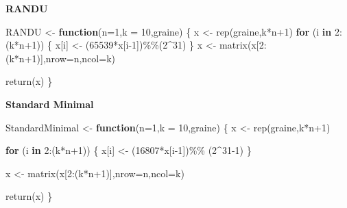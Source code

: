 \documentclass[
]{article}
\newenvironment{Shaded}{\begin{snugshade}}{\end{snugshade}}
\newcommand{\AttributeTok}[1]{\textcolor[rgb]{0.77,0.63,0.00}{#1}}
\newcommand{\ControlFlowTok}[1]{\textcolor[rgb]{0.13,0.29,0.53}{\textbf{#1}}}
\newcommand{\DecValTok}[1]{\textcolor[rgb]{0.00,0.00,0.81}{#1}}
\newcommand{\FunctionTok}[1]{\textcolor[rgb]{0.00,0.00,0.00}{#1}}
\newcommand{\NormalTok}[1]{#1}
\newcommand{\OtherTok}[1]{\textcolor[rgb]{0.56,0.35,0.01}{#1}}
\newcommand{\SpecialCharTok}[1]{\textcolor[rgb]{0.00,0.00,0.00}{#1}}
\begin{document}
\textbf{RANDU}

\begin{Shaded}
\begin{Highlighting}[]
\NormalTok{RANDU }\OtherTok{\textless{}{-}} \ControlFlowTok{function}\NormalTok{(}\AttributeTok{n=}\DecValTok{1}\NormalTok{,}\AttributeTok{k =} \DecValTok{10}\NormalTok{,graine)}
\NormalTok{\{}
\NormalTok{  x }\OtherTok{\textless{}{-}}  \FunctionTok{rep}\NormalTok{(graine,k}\SpecialCharTok{*}\NormalTok{n}\SpecialCharTok{+}\DecValTok{1}\NormalTok{)}
  \ControlFlowTok{for}\NormalTok{ (i }\ControlFlowTok{in} \DecValTok{2}\SpecialCharTok{:}\NormalTok{(k}\SpecialCharTok{*}\NormalTok{n}\SpecialCharTok{+}\DecValTok{1}\NormalTok{)) \{}
\NormalTok{    x[i] }\OtherTok{\textless{}{-}}\NormalTok{ (}\DecValTok{65539}\SpecialCharTok{*}\NormalTok{x[i}\DecValTok{{-}1}\NormalTok{])}\SpecialCharTok{\%\%}\NormalTok{(}\DecValTok{2}\SpecialCharTok{\^{}}\DecValTok{31}\NormalTok{)}
\NormalTok{  \}}
\NormalTok{  x }\OtherTok{\textless{}{-}} \FunctionTok{matrix}\NormalTok{(x[}\DecValTok{2}\SpecialCharTok{:}\NormalTok{(k}\SpecialCharTok{*}\NormalTok{n}\SpecialCharTok{+}\DecValTok{1}\NormalTok{)],}\AttributeTok{nrow=}\NormalTok{n,}\AttributeTok{ncol=}\NormalTok{k)}
  
  \FunctionTok{return}\NormalTok{(x)}
\NormalTok{\}}
\end{Highlighting}
\end{Shaded}

\textbf{Standard Minimal}

\begin{Shaded}
\begin{Highlighting}[]
\NormalTok{StandardMinimal }\OtherTok{\textless{}{-}} \ControlFlowTok{function}\NormalTok{(}\AttributeTok{n=}\DecValTok{1}\NormalTok{,}\AttributeTok{k =} \DecValTok{10}\NormalTok{,graine)}
\NormalTok{\{}
\NormalTok{  x }\OtherTok{\textless{}{-}}  \FunctionTok{rep}\NormalTok{(graine,k}\SpecialCharTok{*}\NormalTok{n}\SpecialCharTok{+}\DecValTok{1}\NormalTok{)}
  
  \ControlFlowTok{for}\NormalTok{ (i }\ControlFlowTok{in} \DecValTok{2}\SpecialCharTok{:}\NormalTok{(k}\SpecialCharTok{*}\NormalTok{n}\SpecialCharTok{+}\DecValTok{1}\NormalTok{)) \{}
\NormalTok{    x[i] }\OtherTok{\textless{}{-}}\NormalTok{ (}\DecValTok{16807}\SpecialCharTok{*}\NormalTok{x[i}\DecValTok{{-}1}\NormalTok{])}\SpecialCharTok{\%\%}\NormalTok{ (}\DecValTok{2}\SpecialCharTok{\^{}}\DecValTok{31{-}1}\NormalTok{)}
\NormalTok{  \}}
  
\NormalTok{  x }\OtherTok{\textless{}{-}} \FunctionTok{matrix}\NormalTok{(x[}\DecValTok{2}\SpecialCharTok{:}\NormalTok{(k}\SpecialCharTok{*}\NormalTok{n}\SpecialCharTok{+}\DecValTok{1}\NormalTok{)],}\AttributeTok{nrow=}\NormalTok{n,}\AttributeTok{ncol=}\NormalTok{k)}
  
  \FunctionTok{return}\NormalTok{(x)}
\NormalTok{\}}
\end{Highlighting}
\end{Shaded}
\end{document}

